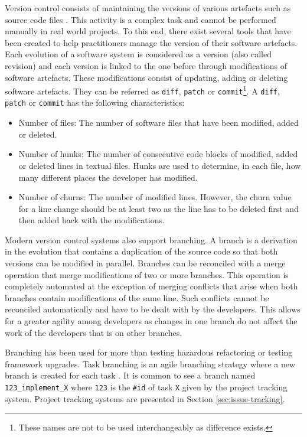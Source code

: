 Version control consists of maintaining the versions of various artefacts  such as source code files \cite{Zeller1997}.
This activity is a complex task and cannot be performed manually in real world projects. To this end, there exist several tools that have been created to help practitioners manage the version of their software artefacts.
Each evolution of a software system is considered as  a version (also called revision) and each version is linked to the one before through modifications of software artefacts. These modifications consist of updating, adding or deleting software artefacts. They can be referred as \texttt{diff}, {\tt patch} or {\tt commit}\footnote{These names are not to be used interchangeably as difference exists.}.
A \texttt{diff}, {\tt patch} or {\tt commit} has the following characteristics:

\begin{itemize}
\item Number of files: The number of software files that have been modified, added or deleted.
\item Number of hunks: The number of consecutive code blocks of modified, added or deleted lines in textual files. Hunks are used to determine, in each file, how many different places the developer has modified.
\item Number of churns:  The number of  modified lines. However, the churn value for a line change should be at least two as the line has to be deleted first and then added back with the modifications.
\end{itemize}

Modern version control systems also support branching.
A branch is a derivation in the evolution that contains a duplication of the source code so that both versions can be modified in parallel.
Branches can be reconciled with a merge operation that merge modifications of  two or more branches.
This operation is completely automated at the exception of merging conflicts that arise when both branches contain modifications of the same line.
Such conflicts cannot be reconciled automatically and have to be dealt with by the developers.
This allows for a greater agility among developers as changes in one branch do not affect the work of the developers that is on  other branches.

Branching has been used for more than testing hazardous refactoring or testing framework upgrades.
Task branching is an agile branching strategy where a new branch is created for each task \cite{MartinFowler2009}.
It is common to see a branch named {\tt 123\_implement\_X} where {\tt 123} is the {\tt \#id} of task {\tt X} given by the project tracking system. Project tracking systems are presented in Section \ref{sec:issue-tracking}.

